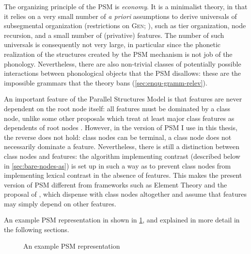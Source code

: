 The organizing principle of the PSM is \emph{economy}. It is a minimalist theory, in that it relies on a very small number of \emph{a priori} assumptions to derive universals of subsegmental organization (\ie restrictions on \textsc{Gen}; \citealt{moren-foa,uffmann07:_restr}), such as tier organization, node recursion, and a small number of (privative) features.  The number of such universals is consequently not very large, in particular since the phonetic realization of the structures created by the PSM mechanism is not job of the phonology. Nevertheless, there are also non\hyp trivial classes of potentially possible interactions between phonological objects that the PSM disallows: these are the impossible grammars that the theory bans (\cref{sec:enqu-gramm-relev}).

An important feature of the Parallel Structures Model is that features are never dependent on the root node itself: all features must be dominated by a class node, unlike some other proposals which treat at least major class features as dependents of root nodes \citep{sagey86,mccarthy88:_featur,halle95:_featur_geomet_featur_spread}. However, in the version of PSM I use in this thesis, the reverse does not hold: class nodes can be terminal, \ie a class node does not necessarily dominate a feature. Nevertheless, there is still a distinction between class nodes and features: the algorithm implementing contrast (described below in \cref{sec:bare-nodes-as}) is set up in such a way as to prevent class nodes from implementing lexical contrast in the absence of features. This makes the present version of PSM different from frameworks such as Element Theory and the proposal of \citet{blaho-diss}, which dispense with class nodes altogether and assume that features may simply depend on other features.

An example PSM representation in shown in \cref{fig:ex-repr}, and explained in more detail in the following sections. \begin{figure}[htp]\centering
{}
\caption{An example PSM representation}\label{fig:ex-repr}
\end{figure}

